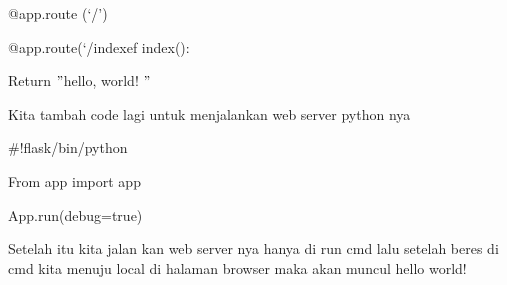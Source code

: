 \vspace{14pt}
\noindent 
{\fontsize{14pt}{14pt}\selectfont @app.route (‘/’) \\} \par
\vspace{14pt}
\noindent 
{\fontsize{14pt}{14pt}\selectfont @app.route(‘/indexef index(): \\} \par
\vspace{14pt}
\noindent 
{\fontsize{14pt}{14pt}\selectfont Return  $ " $hello, world! $ " $ \\} \par
\vspace{14pt}
\noindent 
{\fontsize{14pt}{14pt}\selectfont Kita tambah code lagi untuk menjalankan web server python nya \\} \par
\vspace{14pt}
\vspace{14pt}
\noindent 
{\fontsize{14pt}{14pt}\selectfont  $  \#  $!flask/bin/python \\} \par
\noindent 
{\fontsize{14pt}{14pt}\selectfont From app import app \\} \par
\noindent 
{\fontsize{14pt}{14pt}\selectfont App.run(debug=true) \\} \par
\vspace{14pt}
\noindent 
{\fontsize{14pt}{14pt}\selectfont Setelah itu kita jalan kan web server nya hanya di run cmd lalu setelah beres di cmd kita menuju local di halaman browser maka akan muncul hello world! \\} \par
\vspace{14pt}
\vspace{14pt}
